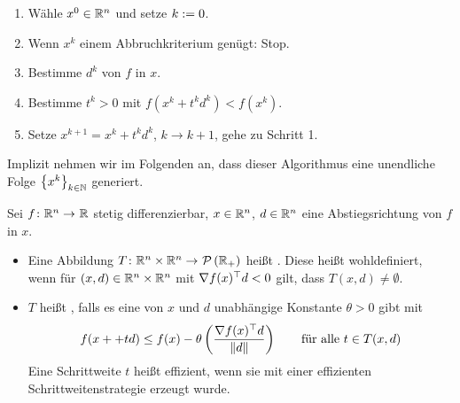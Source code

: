 \begin{algorithmus} \label{algorithmus: 6.5}
	\begin{enumerate}[leftmargin=*, label=Schritt \arabic*., nolistsep]
		\item Wähle $x^0 \in \R^n$ und setze $k \defeq 0$.
		\item Wenn $x^k$ einem Abbruchkriterium genügt: Stop.
		\item Bestimme $d^k$ von $f$ in $x$.
		\item Bestimme $t^k > 0$ mit $f(x^k + t^k d^k) < f(x^k)$.
		\item Setze $x^{k+1} = x^k + t^k d^k$, $k \to k+1$, gehe zu Schritt 1.
	\end{enumerate}
\end{algorithmus}

Implizit nehmen wir im Folgenden an, dass dieser Algorithmus eine unendliche Folge $\folge[k \in \N]{x^k}$ generiert.

\begin{definition}
	Sei $\abb{f}{\R^n}{\R}$ stetig differenzierbar, $x \in \R^n$, $d \in \R^n$ eine Abstiegsrichtung von $f$ in $x$.
	\begin{itemize}[leftmargin=*, nolistsep]
		\item Eine Abbildung $\abb{T}{\R^n \times \R^n}{\pows{\R_+}}$ heißt . Diese heißt wohldefiniert, wenn für $(x,d) \in \R^n \times \R^n$ mit $\nabla\trans{f(x)} d < 0$ gilt, dass $T(x,d) \neq \emptyset$.
		\item $T$ heißt , falls es eine von $x$ und $d$ unabhängige Konstante $\theta > 0$ gibt mit
		\begin{equation*}
			f(x+ + td) \le f(x) - \theta \left( \frac{\nabla \trans{f(x)} d}{ \norm{d}} \right) \qquad \text{für alle } t \in T(x,d)
		\end{equation*}
		Eine Schrittweite $t$ heißt effizient, wenn sie mit einer effizienten Schrittweitenstrategie erzeugt wurde.
	\end{itemize}
\end{definition}

